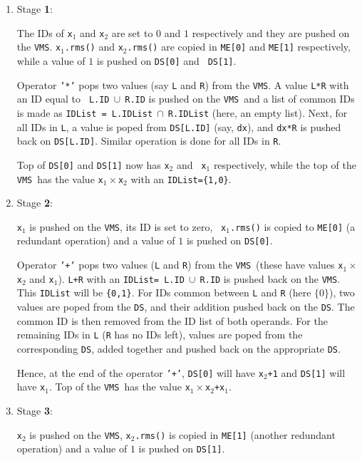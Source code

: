 \documentclass[acmtoms,acmnow]{acmtrans2m}
\newcommand{\DS}{{\tt DS}}
\newcommand{\VMS}{{\tt VMS}}
\begin{document}
\begin{enumerate}
\item Stage {\bf 1}:
  
  The IDs of {\tt x$_1$} and {\tt x$_2$} are set to $0$ and $1$
  respectively and they are pushed on the \VMS.  {\tt x$_1$.rms()}
  and {\tt x$_2$.rms()} are copied in {\tt ME[0]} and {\tt ME[1]}
  respectively, while a value of $1$ is pushed on {\tt DS[0]} and {\tt
  DS[1]}.
  

  Operator {\tt '*'} pops two values (say {\tt L} and {\tt R}) from
  the \VMS.  A value {\tt L*R} with an ID equal to {\tt
  L.ID}$~\cup~${\tt R.ID} is pushed on the \VMS\ and a list of common
  IDs is made as {\tt IDList = L.IDList}$~\cap~${\tt R.IDList} (here,
  an empty list).  Next, for all IDs in {\tt L}, a value is poped from
  {\tt DS[L.ID]} (say, {\tt dx}), and {\tt dx*R} is pushed back on
  {\tt DS[L.ID]}.  Similar operation is done for all IDs in {\tt R}.
  
  Top of {\tt DS[0]} and {\tt DS[1]} now has {\tt x$_2$} and {\tt
  x$_1$} respectively, while the top of the \VMS\ has the value
  {\tt x$_1 \times $x$_2$} with an {\tt IDList=\{1,0\}}.

\item Stage {\bf 2}:
  
  {\tt x$_1$} is pushed on the \VMS, its ID is set to zero, {\tt
  x$_1$.rms()} is copied to {\tt ME[0]} (a redundant operation) and a
  value of $1$ is pushed on {\tt DS[0]}.
  
  Operator {\tt '+'} pops two values ({\tt L} and {\tt R}) from the
  \VMS\ (these have values {\tt x$_1\times$x$_2$} and {\tt x$_1$}).
  {\tt L+R} with an {\tt IDList= L.ID}$~\cup~${\tt R.ID} is pushed
  back on the \VMS.  This {\tt IDList} will be {\tt \{0,1\}}.  For IDs
  common between {\tt L} and {\tt R} (here $\{0\}$), two values are
  poped from the \DS, and their addition pushed back on the \DS.  The
  common ID is then removed from the ID list of both operands.  For
  the remaining IDs in {\tt L} ({\tt R} has no IDs left), values are
  poped from the corresponding \DS, added together and pushed
  back on the appropriate \DS.
  
  Hence, at the end of the operator {\tt '+'}, {\tt DS[0]} will have
  {\tt x$_2$+1} and {\tt DS[1]} will have {\tt x$_1$}.  Top of the
  \VMS\ has the value {\tt x$_1 \times$x$_2$+x$_1$}.

\item Stage {\bf 3}:
  
  {\tt x$_2$} is pushed on the \VMS, {\tt x$_2$.rms()} is copied
  in {\tt ME[1]} (another redundant operation) and a value of $1$ is
  pushed on {\tt DS[1]}.
  

\end{enumerate}
\end{document}
